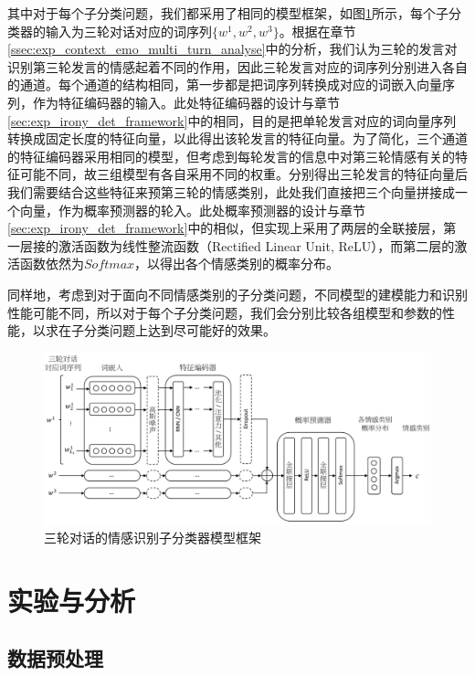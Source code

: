 其中对于每个子分类问题，我们都采用了相同的模型框架，如图\ref{fig:context_emo_cls_framework}所示，每个子分类器的输入为三轮对话对应的词序列$\{w^1, w^2, w^3\}$。根据在章节\ref{ssec:exp_context_emo_multi_turn_analyse}中的分析，我们认为三轮的发言对识别第三轮发言的情感起着不同的作用，因此三轮发言对应的词序列分别进入各自的通道。每个通道的结构相同，第一步都是把词序列转换成对应的词嵌入向量序列，作为特征编码器的输入。此处特征编码器的设计与章节\ref{sec:exp_irony_det_framework}中的相同，目的是把单轮发言对应的词向量序列转换成固定长度的特征向量，以此得出该轮发言的特征向量。为了简化，三个通道的特征编码器采用相同的模型，但考虑到每轮发言的信息中对第三轮情感有关的特征可能不同，故三组模型有各自采用不同的权重。分别得出三轮发言的特征向量后我们需要结合这些特征来预第三轮的情感类别，此处我们直接把三个向量拼接成一个向量，作为概率预测器的轮入。此处概率预测器的设计与章节\ref{sec:exp_irony_det_framework}中的相似，但实现上采用了两层的全联接层，第一层接的激活函数为线性整流函数（Rectified Linear Unit, ReLU），而第二层的激活函数依然为$Softmax$，以得出各个情感类别的概率分布。

同样地，考虑到对于面向不同情感类别的子分类问题，不同模型的建模能力和识别性能可能不同，所以对于每个子分类问题，我们会分别比较各组模型和参数的性能，以求在子分类问题上达到尽可能好的效果。

\begin{figure}[H]
  \centering
  \includegraphics[width=\textwidth]{img/context_emo_cls_framework.pdf}
  \caption{三轮对话的情感识别子分类器模型框架}
  \label{fig:context_emo_cls_framework}
\end{figure}

\section{实验与分析}
\label{sec:exp_context_emo_exp}

\subsection{数据预处理}

